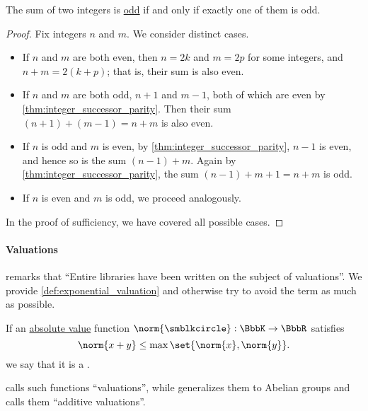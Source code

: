 \begin{proposition}\label{thm:integer_sum_parity}
  The sum of two integers is \hyperref[def:integer_parity]{odd} if and only if exactly one of them is odd.
\end{proposition}
\begin{proof}
  \SufficiencySubProof Fix integers \( n \) and \( m \). We consider distinct cases.

  \begin{itemize}
    \item If \( n \) and \( m \) are both even, then \( n = 2k \) and \( m = 2p \) for some integers, and \( n + m = 2(k + p) \); that is, their sum is also even.

    \item If \( n \) and \( m \) are both odd, \( n + 1 \) and \( m - 1 \), both of which are even by \cref{thm:integer_successor_parity}. Then their sum \( (n + 1) + (m - 1) = n + m \) is also even.

    \item If \( n \) is odd and \( m \) is even, by \cref{thm:integer_successor_parity}, \( n - 1 \) is even, and hence so is the sum \( (n - 1) + m \). Again by \cref{thm:integer_successor_parity}, the sum \( (n - 1) + m + 1 = n + m \) is odd.

    \item If \( n \) is even and \( m \) is odd, we proceed analogously.
  \end{itemize}

  \NecessitySubProof In the proof of sufficiency, we have covered all possible cases.
\end{proof}

\paragraph{Valuations}

 remarks that \enquote{Entire libraries have been written on the subject of valuations}. We provide \cref{def:exponential_valuation} and otherwise try to avoid the term as much as possible.

\begin{definition}\label{def:non_archimedean_absolute_value}
  If an \hyperref[def:absolute_value]{absolute value} function \( \norm{\anon}: \BbbK \to \BbbR \) satisfies
  \begin{equation}\label{eq:def:non_archimedean_absolute_value}
    \norm{x + y} \leq \max\set{ \norm{x}, \norm{y} }.
  \end{equation}
  we say that it is a .
\end{definition}
\begin{comments}
  \item {} calls such functions \enquote{valuations}, while \cite[def. 9.4']{Jacobson1989BasicAlgebraII} generalizes them to Abelian groups and calls them \enquote{additive valuations}.
\end{comments}


